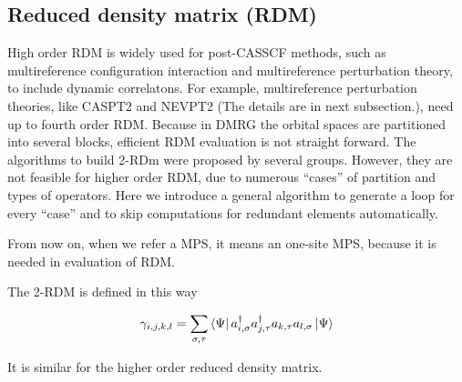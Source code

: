 \subsection{Reduced density matrix (RDM)}

High order RDM is widely used for post-CASSCF methods, such as multireference configuration interaction\cite{buenker_individualized_1974} and multireference perturbation theory\cite{andersson_second-order_1990, angeli_n-electron_2002}, to include dynamic correlatons. For example, multireference perturbation theories, like CASPT2\cite{andersson_second-order_1990} and NEVPT2\cite{angeli_n-electron_2002} (The details are in next subsection.), need up to fourth order RDM. 
Because in DMRG the orbital spaces are partitioned into several blocks, efficient RDM evaluation is not straight forward. The algorithms to build 2-RDm were proposed by several groups.\cite{ghosh_orbital_2008,zgid_obtaining_2008} However, they are not feasible for higher order RDM, due to numerous ``cases'' of partition and types of operators. Here we introduce a general algorithm to generate a loop for every ``case'' and to skip computations for redundant elements automatically.

From now on, when we refer a MPS, it means an one-site MPS, because it is needed in evaluation of RDM.

The 2-RDM is defined in this way

\begin{equation}
\gamma_{i,j,k,l}=\sum_{\sigma,\tau} \bra{\Psi}a^\dagger_{i,\sigma}a^\dagger_{j,\tau}a_{k,\tau}a_{l,\sigma}\ket{\Psi}
\end{equation}

It is similar for the higher order reduced density matrix.

%
%


